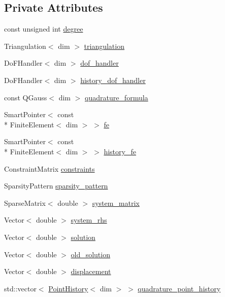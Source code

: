\subsection*{Private Attributes}
\begin{DoxyCompactItemize}
\item 
const unsigned int \hyperlink{classvsf_1_1ApShear_ae4927f95e4a98c107d743a078a9b1bc8}{degree}
\item 
Triangulation$<$ dim $>$ \hyperlink{classvsf_1_1ApShear_a53d0e9d3fdabcac44cc7c6408ace451b}{triangulation}
\item 
Do\-F\-Handler$<$ dim $>$ \hyperlink{classvsf_1_1ApShear_a55da0ced5f7ee7c16a518073f4524ffb}{dof\-\_\-handler}
\item 
Do\-F\-Handler$<$ dim $>$ \hyperlink{classvsf_1_1ApShear_acdcfb9ec77c56722ce42173f7599c336}{history\-\_\-dof\-\_\-handler}
\item 
const Q\-Gauss$<$ dim $>$ \hyperlink{classvsf_1_1ApShear_a2926794d4cbeed7550443a4999868110}{quadrature\-\_\-formula}
\item 
Smart\-Pointer$<$ const \\*
Finite\-Element$<$ dim $>$ $>$ \hyperlink{classvsf_1_1ApShear_a228388a897a688b79d0800f3bb18697f}{fe}
\item 
Smart\-Pointer$<$ const \\*
Finite\-Element$<$ dim $>$ $>$ \hyperlink{classvsf_1_1ApShear_a3c2f9d0e479ed2ebcb3660a3b7b72aee}{history\-\_\-fe}
\item 
Constraint\-Matrix \hyperlink{classvsf_1_1ApShear_afcd25b4c0be9a4c7e69165e6eb151240}{constraints}
\item 
Sparsity\-Pattern \hyperlink{classvsf_1_1ApShear_a065cb85ed84df073fd1b726667eebcc3}{sparsity\-\_\-pattern}
\item 
Sparse\-Matrix$<$ double $>$ \hyperlink{classvsf_1_1ApShear_a8735861f0a5530262407cd52b7a1b386}{system\-\_\-matrix}
\item 
Vector$<$ double $>$ \hyperlink{classvsf_1_1ApShear_ab1046cf38cb6535dd0ab78793bccf6a1}{system\-\_\-rhs}
\item 
Vector$<$ double $>$ \hyperlink{classvsf_1_1ApShear_ae4ee8cb26cbb92aa25fa91d2eb2198db}{solution}
\item 
Vector$<$ double $>$ \hyperlink{classvsf_1_1ApShear_a82d7592738e4d616740bb21a3aa1e394}{old\-\_\-solution}
\item 
Vector$<$ double $>$ \hyperlink{classvsf_1_1ApShear_a24a3ff890f533f1ccc640371c6230d78}{displacement}
\item 
std\-::vector$<$ \hyperlink{structvsf_1_1PointHistory}{Point\-History}$<$ dim $>$ $>$ \hyperlink{classvsf_1_1ApShear_aeb702a26aef2b0a7d0d27d46909b81b9}{quadrature\-\_\-point\-\_\-history}

\end{DoxyCompactItemize}
